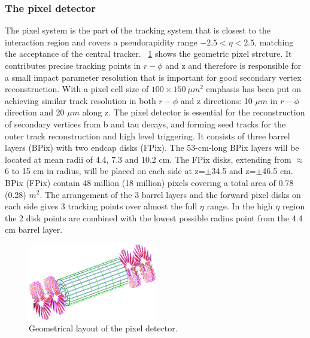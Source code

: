 \subsubsection{The pixel detector}
The pixel system is the part of the tracking system that is closest to the interaction region and covers a pseudorapidity range $-2.5 < \eta  < 2.5$, matching the acceptance of the central tracker. \figurename~\ref{Pixel_structure} shows the geometric pixel strcture. It contributes precise tracking points in $r - \phi$ and z and therefore is responsible for a small impact parameter resolution that is important for good secondary vertex reconstruction. With a pixel cell size of $100 \times 150\ \mu m^{2}$ emphasis has been put on achieving similar track resolution in both $r-\phi$ and z directions: 10 $\mu m$ in $r - \phi$ direction and 20 $\mu m$ along z. The pixel detector is essential for the reconstruction of secondary vertices from b and tau decays, and forming seed tracks for the outer track reconstruction and high level triggering. It consists of three barrel layers (BPix) with two endcap disks (FPix). The 53-cm-long BPix layers will be located at mean radii of 4.4, 7.3 and 10.2 cm. The FPix disks, extending from $\approx$ 6 to 15 cm in radius, will be placed on each side at z=$\pm$34.5 and z=$\pm$46.5 cm. BPix (FPix) contain 48 million (18 million) pixels covering a total area of 0.78 (0.28) $m^{2}$. The arrangement of the 3 barrel layers and the forward pixel disks on each side gives 3 tracking points over almost the full $\eta$ range. In the high $\eta$ region the 2 disk points are combined with the lowest possible radius point from the 4.4 cm barrel layer.
\begin{figure}[htbp]
\centering
\includegraphics[width=0.5\textwidth]{Images/Pixel_structure}
\caption{Geometrical layout of the pixel detector.}
\label{Pixel_structure}
\end{figure}


